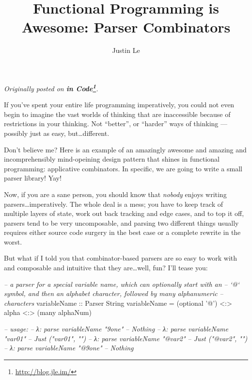 \documentclass[]{article}
\title{Functional Programming is Awesome: Parser Combinators}
\author{Justin Le}
\newenvironment{Shaded}{}{}
\newcommand{\DataTypeTok}[1]{\textcolor[rgb]{0.56,0.13,0.00}{{#1}}}
\newcommand{\CharTok}[1]{\textcolor[rgb]{0.25,0.44,0.63}{{#1}}}
\newcommand{\CommentTok}[1]{\textcolor[rgb]{0.38,0.63,0.69}{\textit{{#1}}}}
\newcommand{\OtherTok}[1]{\textcolor[rgb]{0.00,0.44,0.13}{{#1}}}
\newcommand{\FunctionTok}[1]{\textcolor[rgb]{0.02,0.16,0.49}{{#1}}}
\newcommand{\NormalTok}[1]{{#1}}
\renewcommand{\href}[2]{#2\footnote{\url{#1}}}
\begin{document}
\maketitle

\emph{Originally posted on \textbf{\href{http://blog.jle.im/}{in
Code}}.}

If you've spent your entire life programming imperatively, you could not
even begin to imagine the vast worlds of thinking that are inaccessible
because of restrictions in your thinking. Not ``better'', or ``harder''
ways of thinking --- possibly just as easy, but\ldots{}different.

Don't believe me? Here is an example of an amazingly awesome and amazing
and incomprehensibly mind-opeining design pattern that shines in
functional programming: applicative combinators. In specific, we are
going to write a small parser library! Yay!

Now, if you are a sane person, you should know that \emph{nobody} enjoys
writing parsers\ldots{}imperatively. The whole deal is a mess; you have
to keep track of multiple layers of state, work out back tracking and
edge cases, and to top it off, parsers tend to be very uncomposable, and
parsing two different things usually requires either source code surgery
in the best case or a complete rewrite in the worst.

But what if I told you that combinator-based parsers are so easy to work
with and composable and intuitive that they are\ldots{}well, fun? I'll
tease you:

\begin{Shaded}
\begin{Highlighting}[]
\CommentTok{-- a parser for a special variable name, which can optionally start with an}
\CommentTok{-- `@` symbol, and then an alphabet character, followed by many alphanumeric}
\CommentTok{-- characters}
\OtherTok{variableName ::} \DataTypeTok{Parser} \DataTypeTok{String}
\NormalTok{variableName }\FunctionTok{=} \NormalTok{(optional }\CharTok{'@'}\NormalTok{) }\FunctionTok{<:>} \NormalTok{alpha }\FunctionTok{<:>} \NormalTok{(many alphaNum)}

\CommentTok{-- usage:}
\CommentTok{-- λ: parse variableName "9one"}
\CommentTok{-- Nothing}
\CommentTok{-- λ: parse variableName "var01"}
\CommentTok{-- Just ("var01", "")}
\CommentTok{-- λ: parse variableName "@var2"}
\CommentTok{-- Just ("@var2", "")}
\CommentTok{-- λ: parse variableName "@9one"}
\CommentTok{-- Nothing}
\end{Highlighting}
\end{Shaded}
\end{document}
